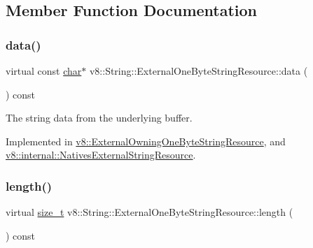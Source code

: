 \subsection{Member Function Documentation}
\mbox{\label{classv8_1_1String_1_1ExternalOneByteStringResource_aaeca31240d3dbf990d1b974e3c64593e}} 
\subsubsection{\texorpdfstring{data()}{data()}}
{\footnotesize\ttfamily virtual const \mbox{\hyperlink{classchar}{char}}$\ast$ v8\+::\+String\+::\+External\+One\+Byte\+String\+Resource\+::data (\begin{DoxyParamCaption}{ }\end{DoxyParamCaption}) const\hspace{0.3cm}{\ttfamily [pure virtual]}}

The string data from the underlying buffer. 

Implemented in \mbox{\hyperlink{classv8_1_1ExternalOwningOneByteStringResource_a212c07a5f7faba9bd71544bdb6dbd321}{v8\+::\+External\+Owning\+One\+Byte\+String\+Resource}}, and \mbox{\hyperlink{classv8_1_1internal_1_1NativesExternalStringResource_a80047e38c07b82d4632e7f0e35ff24b0}{v8\+::internal\+::\+Natives\+External\+String\+Resource}}.

\mbox{\label{classv8_1_1String_1_1ExternalOneByteStringResource_ad6b702f05798bcfc3975cb922f32b5ab}} 
\subsubsection{\texorpdfstring{length()}{length()}}
{\footnotesize\ttfamily virtual \mbox{\hyperlink{classsize__t}{size\+\_\+t}} v8\+::\+String\+::\+External\+One\+Byte\+String\+Resource\+::length (\begin{DoxyParamCaption}{ }\end{DoxyParamCaption}) const\hspace{0.3cm}{\ttfamily [pure virtual]}}

